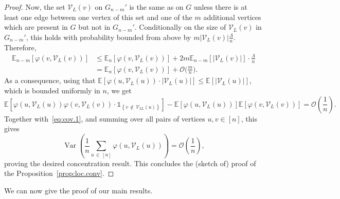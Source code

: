 \documentclass[AHL,Unicode,longabstracts,published]{cedram}
\newcommand{\bbE}{\mathbb{E}}
\newcommand{\cV}{\mathcal{V}}
\newcommand{\cO}{\mathcal{O}}
\DeclareMathOperator{\rVar}{Var}
\begin{document}
\begin{proof}
Now, the set $\cV_L(v)$ on $G_{n-m}'$ is the same as on $G$ unless there is at least one edge between one vertex of this set and one of the $m$ additional vertices which are present in $G$ but not in $G_{n-m}'$. Conditionally on the size of $\cV_L(v)$ in $G_{n-m}'$, this holds with probability bounded from above by $m|\cV_L(v)|\tfrac{\Lambda}{n}$. Therefore,
\begin{align*}
\bbE_{n-m}[\varphi(v,\cV_L(v))] &\le
\bbE_n[\varphi(v,\cV_L(v))] + 2 m\bbE_{n-m}[|\cV_L(v)|] \cdot \tfrac{\Lambda}{n}\\
&=\bbE_n[\varphi(v,\cV_L(v))] + \cO\bigg(\frac mn\bigg).
\end{align*}
As a consequence, using that $\bbE[\varphi(u, \cV_L(u))\cdot |\cV_L(u)|]\le \bbE[|\cV_L(u)|]$, which is bounded uniformly in $n$, we get
\[
\bbE\left[\varphi(u,\cV_L(u)) \varphi(v,\cV_L(v))\cdot
\mathds{1}_{\left\{ v\,\notin\,\cV_{2L}(u)\right\}}\right] - \bbE\left[\varphi(u,\cV_L(u))\right] \bbE\left[\varphi(v,\cV_L(v))\right] = \cO\left(\frac 1n\right).
\]
Together with~\eqref{eq:cov.1}, and summing over all pairs of vertices $u,v\in [n]$, this gives
\[
\rVar\left(\frac 1n \sum_{u\,\in\,[n]} \varphi(u,\cV_L(u))\right) = \cO\left(\frac 1n\right),
\]
proving the desired concentration result. This concludes the (sketch of) proof of the Proposition~\ref{prop:loc.conv}.
\end{proof}

We can now give the proof of our main results.
\end{document}
